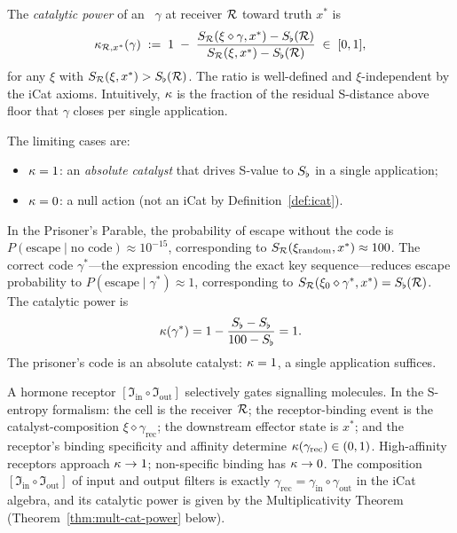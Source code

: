 \begin{definition}\label{def:cat-power}
The \emph{catalytic power} of an \iCat\ $\gamma$ at receiver $\mathcal{R}$ toward truth $x^*$ is
\[
\kappa_{\mathcal{R}, x^*}(\gamma) \;:=\; 1 \;-\; \frac{S_{\mathcal{R}}(\xi \diamond \gamma, x^*) - S_{\flat}(\mathcal{R})}{S_{\mathcal{R}}(\xi, x^*) - S_{\flat}(\mathcal{R})} \;\in\; [0, 1],
\]
for any $\xi$ with $S_{\mathcal{R}}(\xi, x^*) > S_{\flat}(\mathcal{R})$. The ratio is well-defined and $\xi$-independent by the iCat axioms. Intuitively, $\kappa$ is the fraction of the residual S-distance above floor that $\gamma$ closes per single application.
\end{definition}

The limiting cases are:
\begin{itemize}[nosep]
  \item $\kappa = 1$: an \emph{absolute catalyst} that drives S-value to $S_{\flat}$ in a single application;
  \item $\kappa = 0$: a null action (not an iCat by Definition~\ref{def:icat}).
\end{itemize}

\begin{example}\label{ex:prisoner-icat}
In the Prisoner's Parable, the probability of escape without the code is $P(\text{escape} \mid \text{no code}) \approx 10^{-15}$, corresponding to $S_{\mathcal{R}}(\xi_{\text{random}}, x^*) \approx 100$. The correct code $\gamma^*$---the expression encoding the exact key sequence---reduces escape probability to $P(\text{escape} \mid \gamma^*) \approx 1$, corresponding to $S_{\mathcal{R}}(\xi_0 \diamond \gamma^*, x^*) = S_{\flat}(\mathcal{R})$. The catalytic power is
\[
\kappa(\gamma^*) = 1 - \frac{S_{\flat} - S_{\flat}}{100 - S_{\flat}} = 1.
\]
The prisoner's code is an absolute catalyst: $\kappa = 1$, a single application suffices.
\end{example}

\begin{example}\label{ex:bmd-icat}
A hormone receptor $[\mathfrak{I}_{\mathrm{in}} \circ \mathfrak{I}_{\mathrm{out}}]$ selectively gates signalling molecules. In the S-entropy formalism: the cell is the receiver $\mathcal{R}$; the receptor-binding event is the catalyst-composition $\xi \diamond \gamma_{\text{rec}}$; the downstream effector state is $x^*$; and the receptor's binding specificity and affinity determine $\kappa(\gamma_{\text{rec}}) \in (0,1)$. High-affinity receptors approach $\kappa \to 1$; non-specific binding has $\kappa \to 0$. The composition $[\mathfrak{I}_{\mathrm{in}} \circ \mathfrak{I}_{\mathrm{out}}]$ of input and output filters is exactly $\gamma_{\text{rec}} = \gamma_{\mathrm{in}} \circ \gamma_{\mathrm{out}}$ in the iCat algebra, and its catalytic power is given by the Multiplicativity Theorem (Theorem~\ref{thm:mult-cat-power} below).
\end{example}

